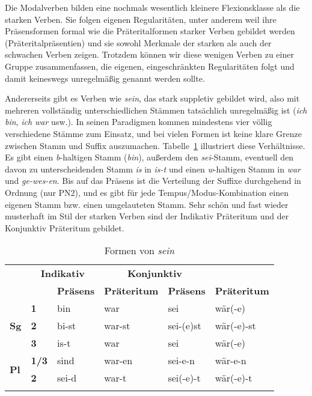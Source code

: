 Die Modalverben bilden eine nochmals wesentlich kleinere Flexionsklasse als die starken Verben.
Sie folgen eigenen Regularitäten, unter anderem weil ihre Präsensformen formal wie die Präteritalformen starker Verben gebildet werden (Präteritalpräsentien) und sie sowohl Merkmale der starken als auch der schwachen Verben zeigen.
Trotzdem können wir diese wenigen Verben zu einer Gruppe zusammenfassen, die eigenen, eingeschränkten Regularitäten folgt und damit keineswegs unregelmäßig genannt werden sollte.

Andererseits gibt es Verben wie \textit{sein}, das stark suppletiv gebildet wird, also mit mehreren vollständig unterschiedlichen Stämmen tatsächlich unregelmäßig ist (\textit{ich bin}, \textit{ich war} usw.).
In seinen Paradigmen kommen mindestens vier völlig verschiedene Stämme zum Einsatz, und bei vielen Formen ist keine klare Grenze zwischen Stamm und Suffix auszumachen.
Tabelle~\ref{tab:sein} illustriert diese Verhältnisse.
Es gibt einen \textit{b}-haltigen Stamm (\textit{bin}), außerdem den \textit{sei}-Stamm, eventuell den davon zu unterscheidenden Stamm \textit{is} in \textit{is-t} und einen \textit{w}-haltigen Stamm in \textit{war} und \textit{ge-wes-en}.
Bis auf das Präsens ist die Verteilung der Suffixe durchgehend in Ordnung (nur PN2), und es gibt für jede Tempus\slash Modus-Kombination einen eigenen Stamm bzw. einen umgelauteten Stamm.
Sehr schön und fast wieder musterhaft im Stil der starken Verben sind der Indikativ Präteritum und der Konjunktiv Präteritum gebildet.

\begin{table}
  \centering
  \begin{tabular}{llllll}
    \lsptoprule
    \multicolumn{2}{c}{} & \multicolumn{2}{c}{\textbf{Indikativ}} & \multicolumn{2}{c}{\textbf{Konjunktiv}} \\
    \multicolumn{2}{c}{} & \textbf{Präsens} & \textbf{Präteritum} & \textbf{Präsens} & \textbf{Präteritum} \\
    \midrule
    \multirow{3}{*}{\textbf{Sg}} & \textbf{1} & bin & war & sei & wär(-e) \\
    & \textbf{2} & bi-st & war-st & sei-(e)st & wär(-e)-st \\
    & \textbf{3} & is-t & war & sei & wär(-e) \\
     \multirow{2}{*}{\textbf{Pl}} & \textbf{1/3} & sind & war-en & sei-e-n & wär-e-n \\
     & \textbf{2} & sei-d & war-t & sei(-e)-t & wär(-e)-t \\
    \lspbottomrule
  \end{tabular}
  \caption{Formen von \textit{sein}}
  \label{tab:sein}
\end{table}

